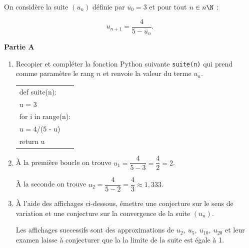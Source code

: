 
\medskip

%

On considère la suite $\left(u_n\right)$ définie par $u_0 = 3$ et pour tout $n \in n\N$ :

\[u_{n+1} = \dfrac{4}{5 - u_n}.\]

\medskip

\textbf{Partie A}

\medskip

\begin{enumerate}
\item Recopier et compléter la fonction Python suivante \texttt{suite(n)} qui prend comme
paramètre le rang $n$ et renvoie la valeur du terme $u_n$.

\begin{center}
\begin{tabular}{|l|}\hline
def suite(n):\\
\qquad u = 3\\
\qquad for i in range(n)\quad  :\\
\qquad \qquad u = 4/(5 - u)\\ 
\qquad return u \\ \hline
\end{tabular}
\end{center}

\item %

À la première boucle on trouve $u_1 = \dfrac{4}{5 - 3} = \dfrac{4}{2} = 2$.


À la seconde on trouve $u_2 = \dfrac{4}{5 - 2} = \dfrac{4}{3}\approx 1,333$.

\item À l'aide des affichages ci-dessous, émettre une conjecture sur le sens de variation et une conjecture sur la convergence de la suite $\left(u_n\right)$.

Les affichages successifs sont des approximations de $u_2, \:u_5,\:u_{10}, \: u_{20}$ et leur examen laisse à conjecturer que la la limite de la suite est égale à 1.
\end{enumerate}

